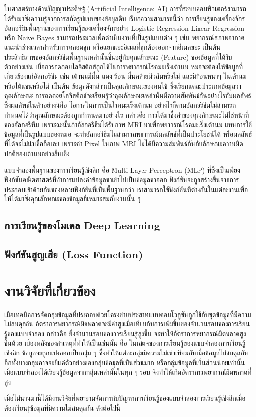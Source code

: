 ในศาสตร์ทางด้านปัญญาประดิษฐ์ (Artificial Intelligence: AI) การที่ระบบคอมพิวเตอร์สามารถได้รับมาซึ่งความรู้จากการสกัดรูปแบบของข้อมูลดิบ 
เรียกความสามารถนี้ว่า การเรียนรู้ของเครื่องจักร อัลกอริธึมพื้นฐานของการเรียนรู้ของเครื่องจักรอย่าง Logistic Regression 
Linear Regression หรือ Naive Bayes สามารถประมวลเพื่อดำเนินงานที่เป็นรูปแบบต่าง ๆ เช่น พยากรณ์สภาพอากาศ 
แนะนำช่วงเวลาสำหรับการคลอดลูก หรือแยกแยะอีเมลที่ถูกต้องออกจากอีเมลขยะ เป็นต้น ประสิทธิภาพของอัลกอริธึมพื้นฐานเหล่านั้นขึ้นอยู่กับคุณลักษณะ (Feature) ของข้อมูลที่ได้รับ ตัวอย่างเช่น เมื่อการถดถอยโลจิสติกส์ถูกใช้ในการพยากรณ์โรคมะเร็งเต้านม หมอจะต้องให้ข้อมูลที่เกี่ยวข้องแก่อัลกอริธึม 
เช่น เต้านมมีผื่น แดง ร้อน ผื่นคล้ายผิวส้มหรือไม่ และมีก้อนหนาๆ ในเต้านมหรือใต้แขนหรือไม่ เป็นต้น ข้อมูลดังกล่าวเป็นคุณลักษณะของคนไข้ 
ซึ่งเรียกแต่ละประเภทข้อมูลว่า คุณลักษณะ การถดถอยโลจิสติกส์จะเรียนรู้ว่าคุณลักษณะเหล่านั้นมีความสัมพันธ์กันอย่างไรกับผลลัพธ์ ซึ่งผลลัพธ์ในตัวอย่างนี่คือ 
โอกาสในการเป็นโรคมะเร็งเต้านม อย่างไรก็ตามอัลกอริธึมไม่สามารถกำหนดได้ว่าคุณลักษณะต้องถูกกำหนดมาอย่างไร กล่าวคือ 
การได้มาซึ่งค่าของคุณลักษณะไม่ใช่หน้าที่ของอัลกอริทึม เพราะฉะนั้นถ้าอัลกอริธึมได้รับภาพ MRI มาเพื่อพยากรณ์โรคมะเร็งเต้านม แทนการใช้ข้อมูลที่เป็นรูปแบบของหมอ 
จะทำอัลกอริธีมไม่สามารถพยากรณ์ผลลัพธ์ที่เป็นประโยชน์ได้ หรือผลลัพธ์ที่ได้จะไม่น่าเชื่อถือเลย เพราะค่า Pixel ในภาพ MRI 
ไม่ได้มีความสัมพันธ์กันกับลักษณะความผิดปกติของเต้านมอย่างสิ้นเชิง

แบบจำลองพื้นฐานของการเรียนรู้เชิงลึก คือ Multi-Layer Perceptron (MLP) ที่ซึ่งเป็นเพียงฟังก์ชันคณิตศาสตร์ที่ทำการแปลงค่าข้อมูลขาเข้าไปเป็นข้อมูลขาออก ฟังก์ชันจะถูกสร้างขึ้นจากการประกอบเข้าด้วยกันของหลายฟังก์ชันที่เป็นพื้นฐานกว่า 
เราสามารถใช้ฟังก์ชันที่ต่างกันในแต่ละงานเพื่อให้ได้มาซึ่งคุณลักษณะของข้อมูลที่เหมาะสมกับงานนั้น ๆ

\subsection{การเรียนรู้ของโมเดล Deep Learning}
\subsection{ฟังก์ชันสูญเสีย (Loss Function)}

\section{งานวิจัยที่เกี่ยวข้อง}
เมื่อเทคนิคการจัดกลุ่มข้อมูลที่ประกอบด้วยโครงข่ายประสาทแบบคอนโวลูชันถูกใช้กับชุดข้อมูลที่มีความไม่สมดุลกัน อัตราการพยากรณ์ผิดพลาดจะมีค่าสูงเมื่อเทียบกับการเพิ่มขึ้นของจำนวนรอบของการเรียนรู้ของแบบจำลอง กล่าวคือ ยิ่งจำนวนรอบของการเรียนรู้สูงขึ้น จะทำให้อัตราการพยากรณ์ผิดพลาดสูงขึ้นด้วย \cite{Yan:2015} เบื้องหลังของสาเหตุที่ทำให้เป็นเช่นนั้น คือ ในเสตจของการเรียนรู้ของแบบจำลองการเรียนรู้เชิงลึก ข้อมูลจะถูกแบ่งออกเป็นกลุ่ม ๆ ซึ่งทำให้แต่ละกลุ่มมีความไม่เท่าเทียมกันเมื่อข้อมูลไม่สมดุลกัน อีกทั้งบางกลุ่มอาจจะมีแค่ตัวอย่างของกลุ่มข้อมูลที่เป็นส่วนมาก หรือกลุ่มข้อมูลที่เป็นส่วนน้อยเท่านั้น เมื่อแบบจำลองได้เรียนรู้ข้อมูลจากกลุ่มเหล่านั้นในทุก ๆ รอบ จึงทำให้เกิดอัตราการพยากรณ์ผิดพลาดที่สูง

เมื่อไม่นานมานี้ได้มีงานวิจัยที่พยายามจัดการกับปัญหาการเรียนรู้ของแบบจำลองการเรียนรู้เชิงลึกเมื่อต้องเรียนรู้ข้อมูลที่มีความไม่สมดุลกัน ดังต่อไปนี้